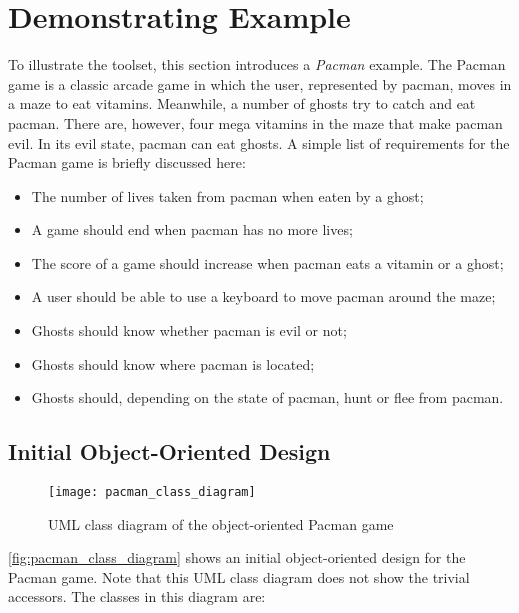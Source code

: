 \section{Demonstrating Example}
\label{sec:demonstratingexample}
To illustrate the \Compose* toolset, this section introduces a \emph{Pacman} example.
The Pacman game is a classic arcade game in which the user, represented by pacman, moves in a maze to eat vitamins.
Meanwhile, a number of ghosts try to catch and eat pacman.
There are, however, four mega vitamins in the maze that make pacman evil.
In its evil state, pacman can eat ghosts.
A simple list of requirements for the Pacman game is briefly discussed here:

\begin{itemize}[noitemsep]
  \item The number of lives taken from pacman when eaten by a ghost;
  \item A game should end when pacman has no more lives;
  \item The score of a game should increase when pacman eats a vitamin or a ghost;
  \item A user should be able to use a keyboard to move pacman around the maze;
  \item Ghosts should know whether pacman is evil or not;
  \item Ghosts should know where pacman is located;
  \item Ghosts should, depending on the state of pacman, hunt or flee from pacman.
\end{itemize}

\subsection{Initial Object-Oriented Design}

\begin{figure}[htbp]
  \centering
  \texttt{[image: pacman\_class\_diagram]}
  \caption{UML class diagram of the object-oriented Pacman game}
  \label{fig:pacman_class_diagram}
\end{figure}

%
\autoref{fig:pacman_class_diagram} shows an initial object-oriented design for the Pacman game.
Note that this UML class diagram does not show the trivial accessors.
The classes in this diagram are:

